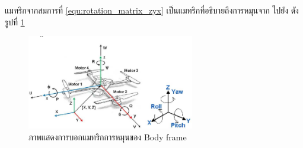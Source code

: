 แมทริกจากสมการที่ \ref{equ:rotation_matrix_zyx} เป็นแมทริกที่อธิบายถึงการหมุนจาก  ไปยัง 
ดังรูปที่ \ref{fig:quadroter_eulerangles}
\begin{figure}[htbp]
	\centering
	\includegraphics[width=0.65\textwidth]{images/Quadcopter_EulerAngles.png}
	\caption{ภาพแสดงการบอกแมทริกการหมุนของ Body frame}
	\label{fig:quadroter_eulerangles}
\end{figure}
